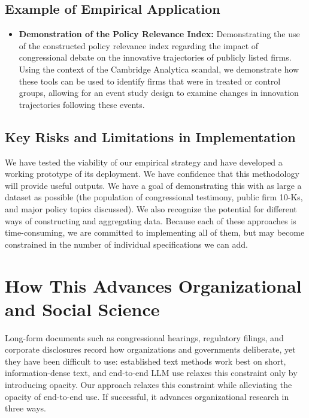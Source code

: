 \documentclass[11pt]{article}
\begin{document}
\subsection{Example of Empirical Application}

\begin{itemize}
    \item \textbf{Demonstration of the Policy Relevance Index:} Demonstrating the use of the constructed policy relevance index regarding the impact of congressional debate on the innovative trajectories of publicly listed firms. Using the context of the Cambridge Analytica scandal, we demonstrate how these tools can be used to identify firms that were in treated or control groups, allowing for an event study design to examine changes in innovation trajectories following these events.
\end{itemize}

\subsection{Key Risks and Limitations in Implementation}

We have tested the viability of our empirical strategy and have developed a working prototype of its deployment. We have confidence that this methodology will provide useful outputs. We have a goal of demonstrating this with as large a dataset as possible (the population of congressional testimony, public firm 10-Ks, and major policy topics discussed). We also recognize the potential for different ways of constructing and aggregating data. Because each of these approaches is time-consuming, we are committed to implementing all of them, but may become constrained in the number of individual specifications we can add.

\section{How This Advances Organizational and Social Science}

Long-form documents such as congressional hearings, regulatory filings, and corporate disclosures record how organizations and governments deliberate, yet they have been difficult to use: established text methods work best on short, information-dense text, and end-to-end LLM use relaxes this constraint only by introducing opacity. Our approach relaxes this constraint while alleviating the opacity of end-to-end use. If successful, it advances organizational research in three ways.
\end{document}
